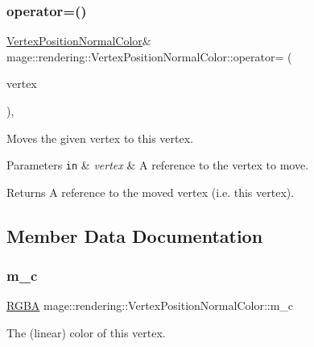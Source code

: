 \subsubsection{\texorpdfstring{operator=()}{operator=()}\hspace{0.1cm}{\footnotesize\ttfamily [2/2]}}
{\footnotesize\ttfamily \mbox{\hyperlink{structmage_1_1rendering_1_1_vertex_position_normal_color}{Vertex\+Position\+Normal\+Color}}\& mage\+::rendering\+::\+Vertex\+Position\+Normal\+Color\+::operator= (\begin{DoxyParamCaption}\item[{\mbox{\hyperlink{structmage_1_1rendering_1_1_vertex_position_normal_color}{Vertex\+Position\+Normal\+Color}} \&\&}]{vertex }\end{DoxyParamCaption})\hspace{0.3cm}{\ttfamily [default]}, {\ttfamily [noexcept]}}

Moves the given vertex to this vertex.


\begin{DoxyParams}[1]{Parameters}
\mbox{\tt in}  & {\em vertex} & A reference to the vertex to move. \\
\hline
\end{DoxyParams}
\begin{DoxyReturn}{Returns}
A reference to the moved vertex (i.\+e. this vertex). 
\end{DoxyReturn}


\subsection{Member Data Documentation}
\mbox{\label{structmage_1_1rendering_1_1_vertex_position_normal_color_a41410eb9dab6e73b59aac40b69637c05}} 
\subsubsection{\texorpdfstring{m\+\_\+c}{m\_c}}
{\footnotesize\ttfamily \mbox{\hyperlink{structmage_1_1_r_g_b_a}{R\+G\+BA}} mage\+::rendering\+::\+Vertex\+Position\+Normal\+Color\+::m\+\_\+c}

The (linear) color of this vertex. \mbox{\label{structmage_1_1rendering_1_1_vertex_position_normal_color_abf35d5cb0057f76dbd6f153ee0f412f4}} 
